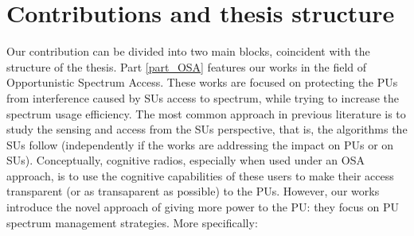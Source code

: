 \section{Contributions and thesis structure}
Our contribution can be divided into two main blocks, coincident with the structure of the thesis. 
Part \ref{part_OSA} features our works in the field of Opportunistic Spectrum Access. 
These works are focused on protecting the PUs from interference caused by SUs access to spectrum, while trying to increase the spectrum usage efficiency. 
The most common approach in previous literature is to study the sensing and access from the SUs perspective, that is, the algorithms the SUs follow (independently if the works are addressing the impact on PUs or on SUs). Conceptually, cognitive radios, especially when used under an OSA approach, is to use the cognitive capabilities of these users to make their access transparent (or as transaparent as possible) to the PUs. 
However, our works introduce the novel approach of giving more power to the PU: they focus on PU spectrum management strategies. More specifically:
